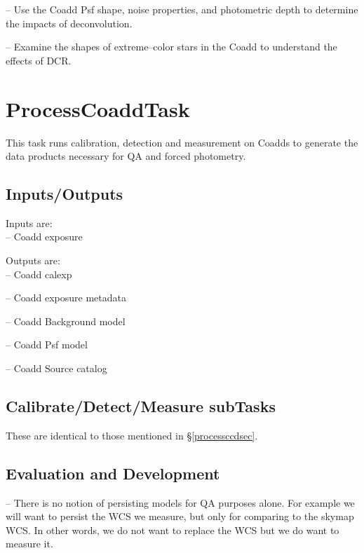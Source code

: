 \documentclass[prd, nofootinbib, floatfix, 11pt,tightenlines,times]{article}
\begin{document}
-- Use the Coadd Psf shape, noise properties, and photometric depth to
determine the impacts of deconvolution.

-- Examine the shapes of extreme--color stars in the Coadd to
understand the effects of DCR.



\section{ProcessCoaddTask} 
This task runs calibration, detection and measurement on Coadds to
generate the data products necessary for QA and forced photometry.  




\subsection{Inputs/Outputs}

Inputs are: \\

-- Coadd exposure

Outputs are:\\

-- Coadd calexp

-- Coadd exposure metadata

-- Coadd Background model

-- Coadd Psf model

-- Coadd Source catalog

\subsection{Calibrate/Detect/Measure subTasks}
These are identical to those mentioned in \S \ref{processccdsec}.

\subsection{Evaluation and Development}

-- There is no notion of persisting models for QA purposes alone.  For example we will want to persist
the WCS we measure, but only for comparing to the skymap WCS.  In other words, we do not want to replace the 
WCS but we do want to measure it.  
\end{document}
